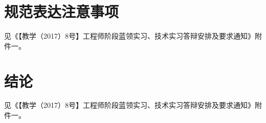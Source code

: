 
\chapter{规范表达注意事项}

见《【教学（2017）8号】工程师阶段蓝领实习、技术实习答辩安排及要求通知》附件一。

\chapter{结论}

见《【教学（2017）8号】工程师阶段蓝领实习、技术实习答辩安排及要求通知》附件一。